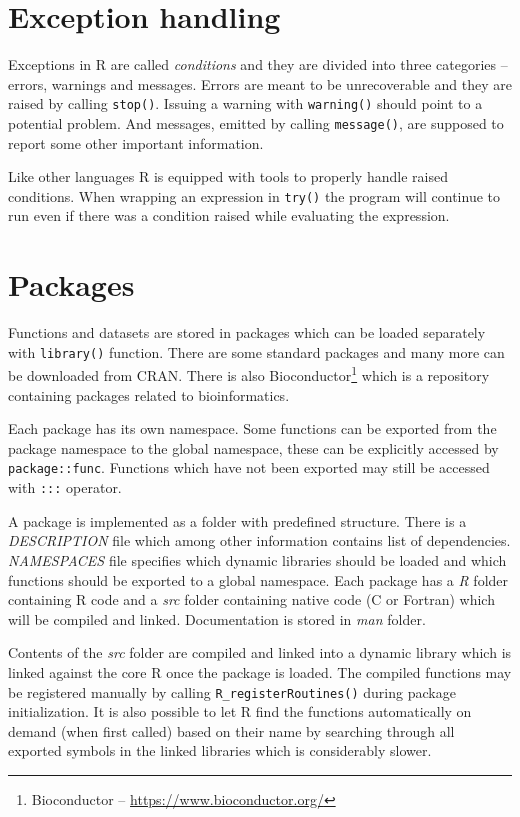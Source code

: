 \documentclass[thesis=M,english,hidelinks]{FITthesis}[2012/10/20]
\begin{document}
	\section{Exception handling}
	Exceptions in R are called \emph{conditions} and they are divided into three categories -- errors, warnings and messages. Errors are meant to be unrecoverable and they are raised by calling \lstinline|stop()|. Issuing a warning with \lstinline|warning()| should point to a potential problem. And messages, emitted by calling \lstinline|message()|, are supposed to report some other important information.\par
	
	Like other languages R is equipped with tools to properly handle raised conditions. When wrapping an expression in \lstinline|try()| the program will continue to run even if there was a condition raised while evaluating the expression.\par
	
	\section{Packages}
	Functions and datasets are stored in packages which can be loaded separately with \lstinline|library()| function. There are some standard packages and many more can be downloaded from CRAN. There is also Bioconductor\footnote{Bioconductor -- \url{https://www.bioconductor.org/}} which is a repository containing packages related to bioinformatics.\par
	
	Each package has its own namespace. Some functions can be exported from the package namespace to the global namespace, these can be explicitly accessed by \lstinline|package::func|. Functions which have not been exported may still be accessed with \lstinline|:::| operator.\par
	
	A package is implemented as a folder with predefined structure. There is a \emph{DESCRIPTION} file which among other information contains list of dependencies. \emph{NAMESPACES} file specifies which dynamic libraries should be loaded and which functions should be exported to a global namespace. Each package has a \emph{R} folder containing R code and a \emph{src} folder containing native code (C or Fortran) which will be compiled and linked. Documentation is stored in \emph{man} folder.\par
	
	Contents of the \emph{src} folder are compiled and linked into a dynamic library which is linked against the core R once the package is loaded. The compiled functions may be registered manually by calling \lstinline|R_registerRoutines()| during package initialization. It is also possible to let R find the functions automatically on demand (when first called) based on their name by searching through all exported symbols in the linked libraries which is considerably slower.\par
	
\end{document}
